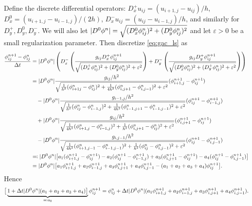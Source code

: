 Define the discrete differential operators: $D_x^+ u_{ij} = (u_{i+1,j} - u_{ij})/h$, $D^0_x = (u_{i+1,j} - u_{i-1,j})/(2h)$,
$D^-_x u_{ij} = (u_{ij} - u_{i-1,j})/h$, and similarly for $D^+_y, D^0_y, D^-_y$.  We will also let $\lvert D^0 \phi^n\rvert = \sqrt{(D^0_x \phi^n_{ij})^2 + (D^0_y \phi^n_{ij})^2 } $ and let $\varepsilon > 0$ be a small regularization parameter. 
Then discretize \eqref{eq:gac_ls} as 
\begin{align*}
\frac{\phi^{n+1}_{ij} - \phi^n_{ij}}{\Delta t} 
&= \lvert D^0 \phi^n\rvert
\left(
D^-_x \left( \frac{g_{ij}D^+_x \phi_{ij}^{n+1}}{\sqrt{ (D^+_x \phi^n_{ij})^2 + (D^0_y \phi^n_{ij})^2 + \varepsilon^2}}
\right) 
+ D^-_y \left(  \frac{g_{ij}D^+_y \phi_{ij}^{n+1}}{\sqrt{ (D^0_x \phi^n_{ij})^2 + (D^+_y \phi^n_{ij})^2  + \varepsilon^2}}
\right)
\right)
\\
&= 
\lvert D^0 \phi^n\rvert\frac{ g_{ij}/h^2 }{\sqrt{ \frac{1}{h^2}(\phi^n_{i+1j} -\phi^n_{ij} )^2 + \frac{1}{4h^2} (\phi^n_{i,j+1} - \phi^n_{i,j-1})^2 + \varepsilon^2}}
(\phi^{n+1}_{i+1,j} - \phi^{n+1}_{ij})
\\
&\quad-\lvert D^0 \phi^n\rvert\frac{ g_{i-1,j}/h^2 }{\sqrt{ \frac{1}{h^2}(\phi^n_{ij} -\phi^n_{i-1,j} )^2 + \frac{1}{4h^2} (\phi^n_{i-1,j+1} - \phi^n_{i-1,j-1})^2 + \varepsilon^2}}
(\phi^{n+1}_{ij} - \phi^{n+1}_{i-1,j}) 
\\
&\quad+\lvert D^0 \phi^n\rvert\frac{ g_{ij}/h^2 }{\sqrt{ \frac{1}{4h^2}(\phi^n_{i+1,j} -\phi^n_{i-1,j} )^2 + \frac{1}{h^2} (\phi^n_{i,j+1} - \phi^n_{ij})^2 + \varepsilon^2}}
(\phi^{n+1}_{i,j+1} - \phi^{n+1}_{ij}) 
\\
&\quad-\lvert D^0 \phi^n\rvert\frac{ g_{i,j-1}/h^2 }{\sqrt{ \frac{1}{4h^2}(\phi^n_{i+1,j-1} -\phi^n_{i-1,j-1} )^2 + \frac{1}{h^2} (\phi^n_{ij} - \phi^n_{i,j-1})^2 + \varepsilon^2}}
(\phi^{n+1}_{ij} - \phi^{n+1}_{i,j-1}) 
\\
&\eqqcolon \lvert D^0 \phi^n\rvert \big[ a_1(\phi^{n+1}_{i+1,j} - \phi^{n+1}_{ij})
- a_2(\phi^{n+1}_{ij} - \phi^{n+1}_{i-1,j}) 
+ a_3(\phi^{n+1}_{i,j+1} - \phi^{n+1}_{ij}) 
- a_4(\phi^{n+1}_{ij} - \phi^{n+1}_{i,j-1})
\big]
\\
&= \lvert D^0 \phi^n\rvert 
\big[ a_1\phi^{n+1}_{i+1,j} 
+ a_2\phi^{n+1}_{i-1,j} 
+ a_3\phi^{n+1}_{i,j+1} 
+ a_4\phi^{n+1}_{i,j-1}
- (a_1 + a_2 + a_3 + a_4) \phi^{n+1}_{ij}
\big].
\end{align*}
Hence 
\begin{align*}
\big[ 
\underbrace{1 + \Delta t\lvert D^0 \phi^n\rvert (a_1 + a_2 + a_3 + a_4) \big]
}_{\eqqcolon a_0} \phi^{n+1}_{ij} 
= \phi^n_{ij} + \Delta t\lvert D^0 \phi^n\rvert (a_1\phi^{n+1}_{i+1,j} 
+ a_2\phi^{n+1}_{i-1,j} 
+ a_3\phi^{n+1}_{i,j+1} 
+ a_4\phi^{n+1}_{i,j-1}).
\end{align*}
